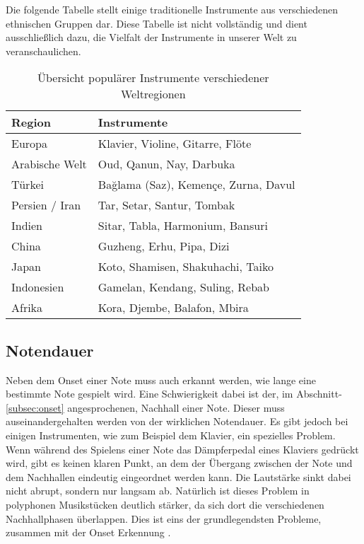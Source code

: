 Die folgende Tabelle stellt einige traditionelle Instrumente aus verschiedenen ethnischen Gruppen dar.
Diese Tabelle ist nicht vollständig und dient ausschließlich dazu,
die Vielfalt der Instrumente in unserer Welt zu veranschaulichen.
\begin{table}[H]
\centering
\begin{tabular}{|l|p{10cm}|}
\hline
\textbf{Region} & \textbf{Instrumente} \\ \hline
Europa & Klavier, Violine, Gitarre, Flöte \\ \hline
Arabische Welt & Oud, Qanun, Nay, Darbuka \\ \hline
Türkei & Bağlama (Saz), Kemençe, Zurna, Davul \\ \hline
Persien / Iran & Tar, Setar, Santur, Tombak \\ \hline
Indien & Sitar, Tabla, Harmonium, Bansuri \\ \hline
China & Guzheng, Erhu, Pipa, Dizi \\ \hline
Japan & Koto, Shamisen, Shakuhachi, Taiko \\ \hline
Indonesien & Gamelan, Kendang, Suling, Rebab \\ \hline
Afrika & Kora, Djembe, Balafon, Mbira \\ \hline
\end{tabular}
\caption{Übersicht populärer Instrumente verschiedener Weltregionen}
\end{table}

\subsection{Notendauer}
Neben dem Onset einer Note muss auch erkannt werden, wie lange eine bestimmte Note gespielt wird.
Eine Schwierigkeit dabei ist der, im Abschnitt-\ref{subsec:onset} angesprochenen, Nachhall einer Note.
Dieser muss auseinandergehalten werden von der wirklichen Notendauer.
Es gibt jedoch bei einigen Instrumenten, wie zum Beispiel dem Klavier, ein spezielles Problem.
Wenn während des Spielens einer Note das Dämpferpedal eines Klaviers gedrückt wird, gibt es keinen klaren Punkt,
an dem der Übergang zwischen der Note und dem Nachhallen eindeutig eingeordnet werden kann.
Die Lautstärke sinkt dabei nicht abrupt, sondern nur langsam ab.
Natürlich ist dieses Problem in polyphonen Musikstücken deutlich stärker,
da sich dort die verschiedenen Nachhallphasen überlappen.
Dies ist eins der grundlegendsten Probleme, zusammen mit der Onset Erkennung .

